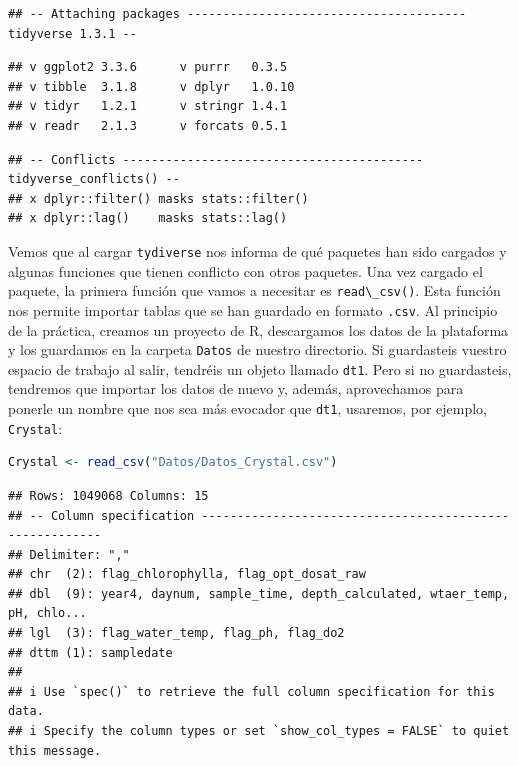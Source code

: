 \documentclass[
]{book}
\newcommand{\passthrough}[1]{#1}
\begin{document}
\begin{lstlisting}
## -- Attaching packages --------------------------------------- tidyverse 1.3.1 --
\end{lstlisting}

\begin{lstlisting}
## v ggplot2 3.3.6      v purrr   0.3.5 
## v tibble  3.1.8      v dplyr   1.0.10
## v tidyr   1.2.1      v stringr 1.4.1 
## v readr   2.1.3      v forcats 0.5.1
\end{lstlisting}

\begin{lstlisting}
## -- Conflicts ------------------------------------------ tidyverse_conflicts() --
## x dplyr::filter() masks stats::filter()
## x dplyr::lag()    masks stats::lag()
\end{lstlisting}

Vemos que al cargar \passthrough{\lstinline!tydiverse!} nos informa de qué paquetes han sido cargados y algunas funciones que tienen conflicto con otros paquetes.
Una vez cargado el paquete, la primera función que vamos a necesitar es \passthrough{\lstinline!read\_csv()!}. Esta función nos permite importar tablas que se han guardado en formato \passthrough{\lstinline!.csv!}. Al principio de la práctica, creamos un proyecto de R, descargamos los datos de la plataforma y los guardamos en la carpeta \passthrough{\lstinline!Datos!} de nuestro directorio. Si guardasteis vuestro espacio de trabajo al salir, tendréis un objeto llamado \passthrough{\lstinline!dt1!}. Pero si no guardasteis, tendremos que importar los datos de nuevo y, además, aprovechamos para ponerle un nombre que nos sea más evocador que \passthrough{\lstinline!dt1!}, usaremos, por ejemplo, \passthrough{\lstinline!Crystal!}:

\begin{lstlisting}[language=R]
Crystal <- read_csv("Datos/Datos_Crystal.csv")
\end{lstlisting}

\begin{lstlisting}
## Rows: 1049068 Columns: 15
## -- Column specification --------------------------------------------------------
## Delimiter: ","
## chr  (2): flag_chlorophylla, flag_opt_dosat_raw
## dbl  (9): year4, daynum, sample_time, depth_calculated, wtaer_temp, pH, chlo...
## lgl  (3): flag_water_temp, flag_ph, flag_do2
## dttm (1): sampledate
## 
## i Use `spec()` to retrieve the full column specification for this data.
## i Specify the column types or set `show_col_types = FALSE` to quiet this message.
\end{lstlisting}
\end{document}
